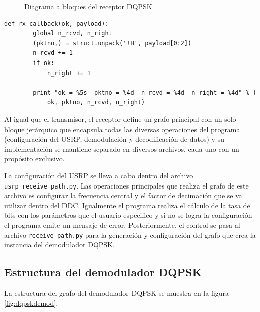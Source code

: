 \begin{figure}[htp]
  \centering
  \vspace{0.3in}
  \caption{Diagrama a bloques del receptor DQPSK}
  \label{fig:grdqpskrx}
\end{figure}

\begin{lstlisting}[float, label=ex:callback, caption={Funci\'on auxiliar que recibe los paquetes decodificados},
breaklines=true]
    def rx_callback(ok, payload):
        global n_rcvd, n_right
        (pktno,) = struct.unpack('!H', payload[0:2])
        n_rcvd += 1
        if ok:
            n_right += 1

        print "ok = %5s  pktno = %4d  n_rcvd = %4d  n_right = %4d" % (
            ok, pktno, n_rcvd, n_right)
\end{lstlisting}

Al igual que el transmisor, el receptor define un grafo principal con un solo bloque jer\'arquico que encapsula todas las
diversas operaciones del programa (configuraci\'on del USRP, demodulaci\'on y decodificaci\'on de datos) y su
implementaci\'on se mantiene separado en diversos archivos, cada uno con un prop\'osito exclusivo.

La configuraci\'on del USRP se lleva a cabo dentro del archivo \\ \verb|usrp_receive_path.py|. Las operaciones principales
que realiza el grafo de este archivo es configurar la frecuencia central y el factor de decimaci\'on que se va utilizar dentro
del DDC. Igualmente el programa realiza el c\'alculo de la tasa de bits con los par\'ametros que el usuario especifico y si
no se logra la configuraci\'on el programa emite un mensaje de error. Posteriormente, el control se pasa al archivo
\verb|receive_path.py| para la generaci\'on y configuraci\'on del grafo que crea la instancia del demodulador DQPSK.


\subsection{Estructura del demodulador DQPSK}
La estructura del grafo del demodulador DQPSK se muestra en la figura \ref{fig:dqpskdemod}.

